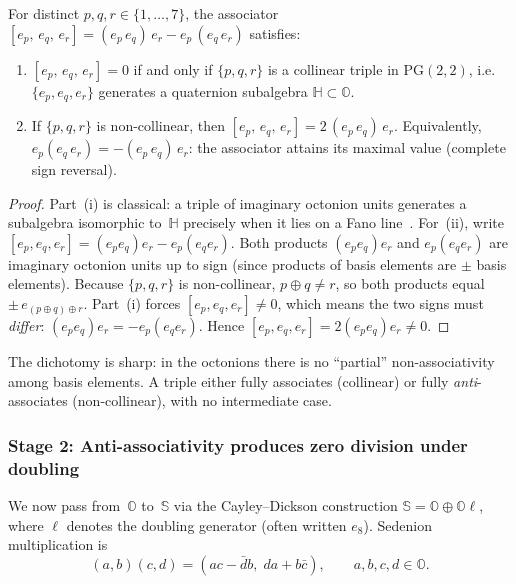 \begin{lemma}
\label{lem:col-assoc}
For distinct $p,q,r\in\{1,\dots,7\}$, the associator
$[e_p,\,e_q,\,e_r] = (e_p\,e_q)\,e_r - e_p\,(e_q\,e_r)$ satisfies:
\begin{enumerate}
\item[\textup{(i)}] $[e_p,\,e_q,\,e_r] = 0$ if and only if
  $\{p,q,r\}$ is a collinear triple in $\mathrm{PG}(2,2)$, i.e.\
  $\{e_p,e_q,e_r\}$ generates a quaternion subalgebra
  $\mathbb{H}\subset\mathbb{O}$.
\item[\textup{(ii)}] If $\{p,q,r\}$ is non-collinear, then
  $[e_p,\,e_q,\,e_r] = 2\,(e_p\,e_q)\,e_r$.
  Equivalently, $e_p(e_q\,e_r) = -(e_p\,e_q)\,e_r$: the associator
  attains its maximal value (complete sign reversal).
\end{enumerate}
\end{lemma}

\begin{proof}
Part~(i) is classical: a triple of imaginary octonion units generates a
subalgebra isomorphic to~$\mathbb{H}$ precisely when it lies on a Fano
line~\cite{Baez2002}.  For~(ii), write $[e_p,e_q,e_r] = (e_pe_q)e_r -
e_p(e_qe_r)$.  Both products $(e_pe_q)e_r$ and $e_p(e_qe_r)$ are
imaginary octonion units up to sign (since products of basis elements
are $\pm$ basis elements).  Because $\{p,q,r\}$ is non-collinear,
$p\oplus q\neq r$, so both products equal $\pm\,e_{(p\oplus q)\oplus r}$.
Part~(i) forces $[e_p,e_q,e_r]\neq 0$, which means the two signs must
\emph{differ}: $(e_pe_q)e_r = -e_p(e_qe_r)$.  Hence $[e_p,e_q,e_r]
= 2(e_pe_q)e_r \neq 0$.
\end{proof}

\begin{remark}\label{rem:anti-assoc-sign}
The dichotomy is sharp: in the octonions there is no ``partial''
non-associativity among basis elements.  A triple either fully associates
(collinear) or fully \emph{anti}-associates (non-collinear), with no
intermediate case.
\end{remark}


\subsubsection*{Stage 2: Anti-associativity produces zero division under
doubling}

We now pass from~$\mathbb{O}$ to~$\mathbb{S}$ via the Cayley–Dickson
construction $\mathbb{S} = \mathbb{O}\oplus\mathbb{O}\ell$, where $\ell$
denotes the doubling generator (often written $e_8$).  Sedenion
multiplication is
\begin{equation}\label{eq:CD-product}
  (a,b)(c,d) = (ac - \bar{d}b,\; da + b\bar{c}),
  \qquad a,b,c,d\in\mathbb{O}.
\end{equation}


